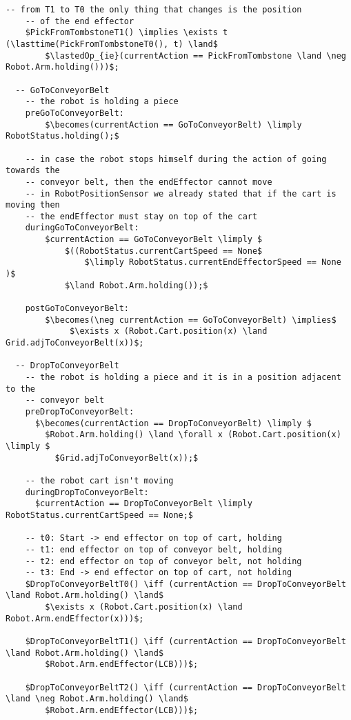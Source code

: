 \begin{lstlisting}[fontadjust, mathescape, frame=single]
    -- from T1 to T0 the only thing that changes is the position
    -- of the end effector
    $PickFromTombstoneT1() \implies \exists t (\lasttime(PickFromTombstoneT0(), t) \land$
        $\lastedOp_{ie}(currentAction == PickFromTombstone \land \neg Robot.Arm.holding()))$;

  -- GoToConveyorBelt
    -- the robot is holding a piece
    preGoToConveyorBelt:
        $\becomes(currentAction == GoToConveyorBelt) \limply RobotStatus.holding();$
    
    -- in case the robot stops himself during the action of going towards the 
    -- conveyor belt, then the endEffector cannot move 
    -- in RobotPositionSensor we already stated that if the cart is moving then 
    -- the endEffector must stay on top of the cart
    duringGoToConveyorBelt:
        $currentAction == GoToConveyorBelt \limply $
            $((RobotStatus.currentCartSpeed == None$ 
                $\limply RobotStatus.currentEndEffectorSpeed == None )$
            $\land Robot.Arm.holding());$

    postGoToConveyorBelt:
        $\becomes(\neg currentAction == GoToConveyorBelt) \implies$
             $\exists x (Robot.Cart.position(x) \land Grid.adjToConveyorBelt(x))$;
      
  -- DropToConveyorBelt
    -- the robot is holding a piece and it is in a position adjacent to the 
    -- conveyor belt
    preDropToConveyorBelt:
      $\becomes(currentAction == DropToConveyorBelt) \limply $
        $Robot.Arm.holding() \land \forall x (Robot.Cart.position(x) \limply $
          $Grid.adjToConveyorBelt(x));$
    
    -- the robot cart isn't moving
    duringDropToConveyorBelt:
      $currentAction == DropToConveyorBelt \limply RobotStatus.currentCartSpeed == None;$

    -- t0: Start -> end effector on top of cart, holding
    -- t1: end effector on top of conveyor belt, holding
    -- t2: end effector on top of conveyor belt, not holding
    -- t3: End -> end effector on top of cart, not holding
    $DropToConveyorBeltT0() \iff (currentAction == DropToConveyorBelt \land Robot.Arm.holding() \land$
        $\exists x (Robot.Cart.position(x) \land Robot.Arm.endEffector(x)))$;
    
    $DropToConveyorBeltT1() \iff (currentAction == DropToConveyorBelt \land Robot.Arm.holding() \land$
        $Robot.Arm.endEffector(LCB)))$;
    
    $DropToConveyorBeltT2() \iff (currentAction == DropToConveyorBelt \land \neg Robot.Arm.holding() \land$
        $Robot.Arm.endEffector(LCB)))$;
    

\end{lstlisting}
